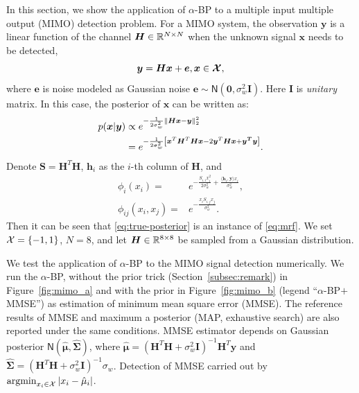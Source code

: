 In this section, we show the application of $\alpha$-BP to a multiple input multiple output (MIMO) detection problem. For a MIMO system, the observation $\bm{y}$ is a linear function of the channel $\bm{H}\in \mathbb{R}^{N\times N}$ when the unknown signal $\bm{x}$ needs to be detected,
\begin{equation}\label{eq:linear-model}
  \bm{y} = \bm{H} \bm{x} + \bm{e}, \bm{x} \in \bm{\mathcal{X}},
\end{equation}
where $\bm{e}$ is  noise modeled as Gaussian noise $ \bm{e} \sim \mathsf{N}\left( \bm{0}, \sigma^2_{w} \bm{I} \right)$. Here $\bm{I}$ is \textit{unitary} matrix. In this case, the posterior of $\bm{x}$ can be written as:
\begin{align}\label{eq:true-posterior}
  p(\bm{x}|\bm{y}) &\propto e^{ - \frac{1}{2\sigma_w^2} \| \bm{Hx} - \bm{y} \|_{2}^2 } \nonumber \\
                   & = e^{ - \frac{1}{2\sigma_w^2}\left[ \bm{x}^{T}\bm{H}^{T}\bm{H}\bm{x} - 2 \bm{y}^T\bm{H}\bm{x}  + \bm{y^T}\bm{y}  \right] }.
\end{align}
Denote $\bm{S} = \bm{H}^T\bm{H}$, $\bm{h}_i$ as the $i$-th column of $\bm{H}$, and
\begin{align}
  \phi_{i}(x_i) =& e^{- \frac{S_{i,i} x_i^2}{2 \sigma_w^2} + \frac{\langle {\bm{h}_i, \bm{y}}\rangle x_i}{\sigma_w^2} },\nonumber \\
  \phi_{ij}(x_i, x_j) =& e^{ -\frac{x_i S_{i,j} x_j}{\sigma_w^2} }.
\end{align}
Then it can be seen that \eqref{eq:true-posterior} is an instance of \eqref{eq:mrf}. We set $\mathcal{X} = \left\{ -1, 1 \right\}$, $N = 8$, and let $\bm{H}\in \mathbb{R}^{8 \times 8}$ be sampled from a Gaussian distribution.

We test the application of $\alpha$-BP to the MIMO signal detection numerically. We run the $\alpha$-BP, without the prior trick (Section~\ref{subsec:remark}) in Figure~\ref{fig:mimo_a} and with the prior in Figure~\ref{fig:mimo_b} (legend ``$\alpha$-BP$+$MMSE'') as estimation of minimum mean square error (MMSE). The reference results of MMSE and maximum a posterior (MAP, exhaustive search) are also reported under the same conditions. MMSE estimator depends on Gaussian posterior $\mathsf{N}(\hat{\bm{\mu}}, \hat{\bm{\Sigma}})$, where $\hat{\bm{\mu}} = (\bm{H}^{T}\bm{H} + \sigma_w^2 \bm{I})^{-1}\bm{H}^{T}\bm{y}$ and $\hat{\bm{\Sigma}} = (\bm{H}^{T}\bm{H} + \sigma_w^2 \bm{I})^{-1}\sigma_w$. Detection of MMSE carried out by $\operatorname{argmin}_{x_i\in \mathcal{X}}| x_i-\hat{\mu}_i |$.%

